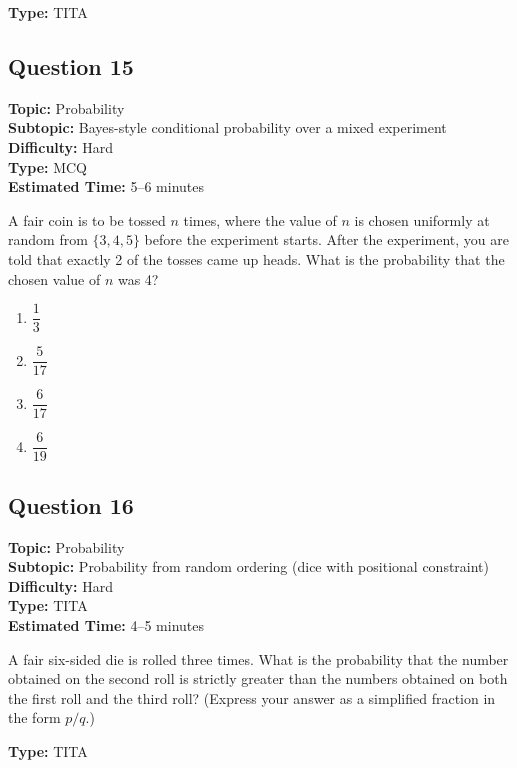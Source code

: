 \documentclass[11pt]{article}
\begin{document}
\textbf{Type:} TITA

\subsection*{Question 15}
\textbf{Topic:} Probability \\
\textbf{Subtopic:} Bayes-style conditional probability over a mixed experiment \\
\textbf{Difficulty:} Hard \\
\textbf{Type:} MCQ \\
\textbf{Estimated Time:} 5--6 minutes

\begin{tcolorbox}
A fair coin is to be tossed \( n \) times, where the value of \( n \) is chosen uniformly at random from \( \{3, 4, 5\} \) before the experiment starts. After the experiment, you are told that exactly 2 of the tosses came up heads. What is the probability that the chosen value of \( n \) was 4?
\end{tcolorbox}

\begin{enumerate}[label=(\Alph*)]
\item \( \dfrac{1}{3} \)
\item \( \dfrac{5}{17} \)
\item \( \dfrac{6}{17} \)
\item \( \dfrac{6}{19} \)
\end{enumerate}

\subsection*{Question 16}
\textbf{Topic:} Probability \\
\textbf{Subtopic:} Probability from random ordering (dice with positional constraint) \\
\textbf{Difficulty:} Hard \\
\textbf{Type:} TITA \\
\textbf{Estimated Time:} 4--5 minutes

\begin{tcolorbox}
A fair six-sided die is rolled three times. What is the probability that the number obtained on the second roll is strictly greater than the numbers obtained on both the first roll and the third roll? (Express your answer as a simplified fraction in the form \( p/q \).)
\end{tcolorbox}

\textbf{Type:} TITA
\end{document}

